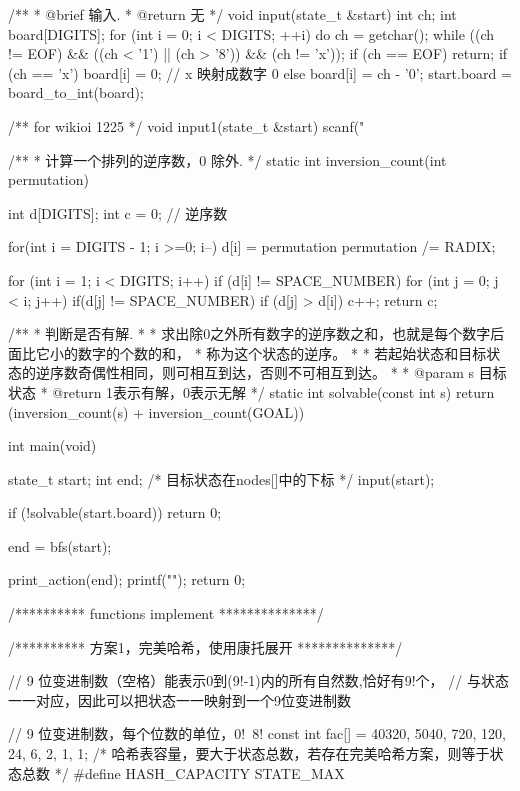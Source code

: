 \begin{Codex}[label=eight_digits_astar.c]
/**
 * @brief 输入.
 * @return 无
 */
void input(state_t &start) {
    int ch;
    int board[DIGITS];
    for (int i = 0; i < DIGITS; ++i) {
        do {
            ch = getchar();
        } while ((ch != EOF) && ((ch < '1') || (ch > '8')) && (ch != 'x'));
        if (ch == EOF) return;
        if (ch == 'x') board[i] = 0; // x 映射成数字 0
        else           board[i] = ch - '0';
    }
    start.board = board_to_int(board);
}

/** for wikioi 1225 */
void input1(state_t &start) {
    scanf("%
}

/**
 * 计算一个排列的逆序数，0 除外.
 */
static int inversion_count(int permutation) {
    int d[DIGITS];
    int c = 0; // 逆序数

    for(int i = DIGITS - 1; i >=0; i--) {
        d[i] = permutation %
        permutation /= RADIX;
    }

    for (int i = 1; i < DIGITS; i++)  if (d[i] != SPACE_NUMBER) {
        for (int j = 0; j < i; j++) {
            if(d[j] != SPACE_NUMBER) {
                if (d[j] > d[i]) {
                    c++;
                }
            }
        }
    }
    return c;
}

/**
 * 判断是否有解.
 *
 * 求出除0之外所有数字的逆序数之和，也就是每个数字后面比它小的数字的个数的和，
 * 称为这个状态的逆序。
 *
 * 若起始状态和目标状态的逆序数奇偶性相同，则可相互到达，否则不可相互到达。
 *
 * @param s 目标状态
 * @return 1表示有解，0表示无解
 */
static int solvable(const int s) {
    return (inversion_count(s) + inversion_count(GOAL)) %
}

int main(void) {
    state_t start;
    int end; /* 目标状态在nodes[]中的下标 */
    input(start);

    if (!solvable(start.board)) return 0;

    end = bfs(start);

    print_action(end);
    printf("\n");
    return 0;
}

/********** functions implement **************/

/********** 方案1，完美哈希，使用康托展开 **************/

// 9 位变进制数（空格）能表示0到(9!-1)内的所有自然数,恰好有9!个，
// 与状态一一对应，因此可以把状态一一映射到一个9位变进制数

// 9 位变进制数，每个位数的单位，0!~8!
const int fac[] = {40320, 5040, 720, 120, 24, 6, 2, 1, 1};
/* 哈希表容量，要大于状态总数，若存在完美哈希方案，则等于状态总数 */
#define HASH_CAPACITY STATE_MAX


\end{Codex}
